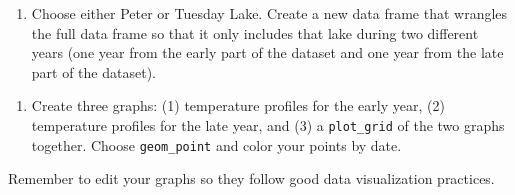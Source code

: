 \documentclass[]{article}
\newenvironment{Shaded}{\begin{snugshade}}{\end{snugshade}}
\newcommand{\DecValTok}[1]{\textcolor[rgb]{0.00,0.00,0.81}{#1}}
\newcommand{\KeywordTok}[1]{\textcolor[rgb]{0.13,0.29,0.53}{\textbf{#1}}}
\newcommand{\NormalTok}[1]{#1}
\newcommand{\OperatorTok}[1]{\textcolor[rgb]{0.81,0.36,0.00}{\textbf{#1}}}
\newcommand{\StringTok}[1]{\textcolor[rgb]{0.31,0.60,0.02}{#1}}
\providecommand{\tightlist}{%
  \setlength{\itemsep}{0pt}\setlength{\parskip}{0pt}}
\begin{document}
\begin{enumerate}
\def\labelenumi{\arabic{enumi}.}
\setcounter{enumi}{4}
\tightlist
\item
  Choose either Peter or Tuesday Lake. Create a new data frame that
  wrangles the full data frame so that it only includes that lake during
  two different years (one year from the early part of the dataset and
  one year from the late part of the dataset).
\end{enumerate}

\begin{Shaded}
\end{Shaded}

\begin{enumerate}
\def\labelenumi{\arabic{enumi}.}
\setcounter{enumi}{5}
\tightlist
\item
  Create three graphs: (1) temperature profiles for the early year, (2)
  temperature profiles for the late year, and (3) a \texttt{plot\_grid}
  of the two graphs together. Choose \texttt{geom\_point} and color your
  points by date.
\end{enumerate}

Remember to edit your graphs so they follow good data visualization
practices.
\end{document}
